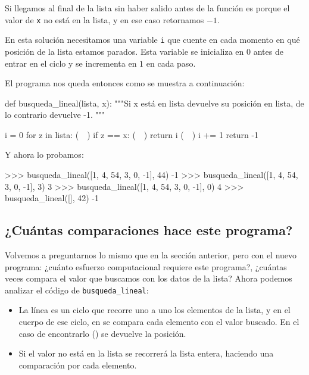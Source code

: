 Si llegamos al final de la lista sin haber salido antes de la función es
porque el valor de \lstinline!x! no está en la lista, y en ese caso
retornamos $-1$.

En esta solución necesitamos una variable \lstinline!i! que cuente en cada
momento en qué posición de la lista estamos parados. Esta variable se
inicializa en $0$ antes de entrar en el ciclo y se incrementa en $1$ en
cada paso.

El programa nos queda entonces como se muestra a continuación:

\begin{codigo-python-sn}
def busqueda_lineal(lista, x):
    """Si x está en lista devuelve su posición en lista, de lo
    contrario devuelve -1.
    """

    i = 0
    for z in lista: (~~)
        if z == x: (~~)
            return i (~~)
        i += 1
    return -1
\end{codigo-python-sn}

Y ahora lo probamos:

\begin{codigo-python-sn}
>>> busqueda_lineal([1, 4, 54, 3, 0, -1], 44)
-1
>>> busqueda_lineal([1, 4, 54, 3, 0, -1], 3)
3
>>> busqueda_lineal([1, 4, 54, 3, 0, -1], 0)
4
>>> busqueda_lineal([], 42)
-1
\end{codigo-python-sn}

\subsection*{¿Cuántas comparaciones hace este programa?}
\label{busqueda-lineal}

Volvemos a preguntarnos lo mismo que en la sección anterior, pero con el nuevo
programa: ¿cuánto esfuerzo computacional requiere este programa?, ¿cuántas
veces compara el valor que buscamos con los datos de la lista? Ahora podemos
analizar el código de \lstinline!busqueda_lineal!:

\begin{itemize}
\item La línea  es un ciclo que recorre uno a uno los
elementos de la lista, y en el cuerpo de ese ciclo, en  se
compara cada elemento con el valor buscado. En el caso de encontrarlo
() se devuelve la posición.

\item Si el valor no está en la lista se recorrerá la lista entera, haciendo
una comparación por cada elemento.
\end{itemize}


